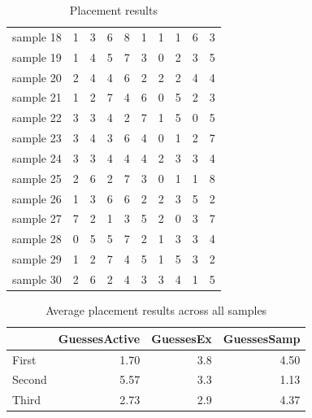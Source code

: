 \begin{table}
\begin{tabular}{|l|rrr|rrr|rrr|}
sample 18 &             1 &  3 &  6 &         8 &  1 &  1 &           1 &  6 &  3 \\
sample 19 &             1 &  4 &  5 &         7 &  3 &  0 &           2 &  3 &  5 \\
sample 20 &             2 &  4 &  4 &         6 &  2 &  2 &           2 &  4 &  4 \\
sample 21 &             1 &  2 &  7 &         4 &  6 &  0 &           5 &  2 &  3 \\
sample 22 &             3 &  3 &  4 &         2 &  7 &  1 &           5 &  0 &  5 \\
sample 23 &             3 &  4 &  3 &         6 &  4 &  0 &           1 &  2 &  7 \\
sample 24 &             3 &  3 &  4 &         4 &  4 &  2 &           3 &  3 &  4 \\
sample 25 &             2 &  6 &  2 &         7 &  3 &  0 &           1 &  1 &  8 \\
sample 26 &             1 &  3 &  6 &         6 &  2 &  2 &           3 &  5 &  2 \\
sample 27 &             7 &  2 &  1 &         3 &  5 &  2 &           0 &  3 &  7 \\
sample 28 &             0 &  5 &  5 &         7 &  2 &  1 &           3 &  3 &  4 \\
sample 29 &             1 &  2 &  7 &         4 &  5 &  1 &           5 &  3 &  2 \\
sample 30 &             2 &  6 &  2 &         4 &  3 &  3 &           4 &  1 &  5 \\
\bottomrule
\end{tabular}
\caption{Placement results}
\end{table}


\begin{table}
\begin{tabular}{lrrr}
\toprule
{} &  GuessesActive &  GuessesEx &  GuessesSamp \\
\midrule
First  &           1.70 &        3.8 &         4.50 \\
Second &           5.57 &        3.3 &         1.13 \\
Third  &           2.73 &        2.9 &         4.37 \\
\bottomrule
\end{tabular}
\caption{Average placement results across all samples}
\end{table}


